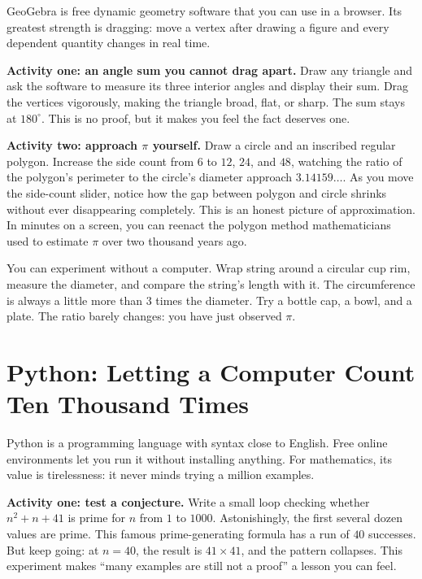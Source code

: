 GeoGebra is free dynamic geometry software that you can use in a browser. Its greatest strength is dragging: move a vertex after drawing a figure and every dependent quantity changes in real time.

\textbf{Activity one: an angle sum you cannot drag apart.} Draw any triangle and ask the software to measure its three interior angles and display their sum. Drag the vertices vigorously, making the triangle broad, flat, or sharp. The sum stays at $180^\circ$. This is no proof, but it makes you feel the fact deserves one.

\textbf{Activity two: approach $\pi$ yourself.} Draw a circle and an inscribed regular polygon. Increase the side count from $6$ to $12$, $24$, and $48$, watching the ratio of the polygon's perimeter to the circle's diameter approach $3.14159\dots$. As you move the side-count slider, notice how the gap between polygon and circle shrinks without ever disappearing completely. This is an honest picture of approximation. In minutes on a screen, you can reenact the polygon method mathematicians used to estimate $\pi$ over two thousand years ago.

\begin{shiyan}
You can experiment without a computer. Wrap string around a circular cup rim, measure the diameter, and compare the string's length with it. The circumference is always a little more than $3$ times the diameter. Try a bottle cap, a bowl, and a plate. The ratio barely changes: you have just observed $\pi$.
\end{shiyan}

\section{Python: Letting a Computer Count Ten Thousand Times}

Python is a programming language with syntax close to English. Free online environments let you run it without installing anything. For mathematics, its value is tirelessness: it never minds trying a million examples.

\textbf{Activity one: test a conjecture.} Write a small loop checking whether $n^2+n+41$ is prime for $n$ from $1$ to $1000$. Astonishingly, the first several dozen values are prime. This famous prime-generating formula has a run of $40$ successes. But keep going: at $n=40$, the result is $41\times41$, and the pattern collapses. This experiment makes ``many examples are still not a proof'' a lesson you can feel.

